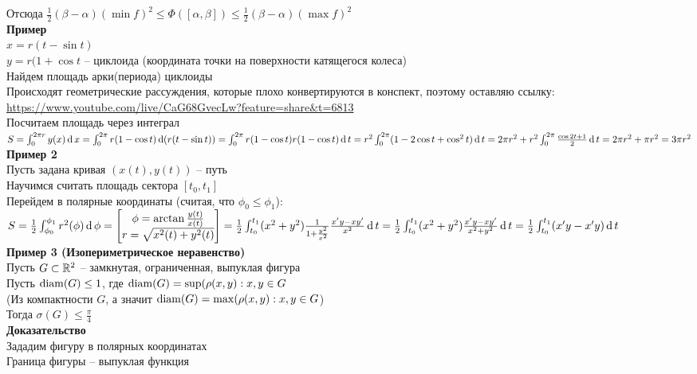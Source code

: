 \documentclass[12pt]{article}
\begin{document}
Отсюда $\frac12(\beta-\alpha) (\min f)^2 \leq \Phi([\alpha, \beta]) \leq \frac12(\beta - \alpha)(\max f)^2$\\
\textbf{Пример}\\
$x = r(t-\sin t)$\\
$y = r(1 + \cos t$ -- циклоида (координата точки на поверхности катящегося колеса)\\
Найдем площадь арки(периода) циклоиды\\
Происходят геометрические рассуждения, которые плохо конвертируются в конспект, поэтому оставляю ссылку: \url{https://www.youtube.com/live/CaG68GvecLw?feature=share&t=6813}\\
Посчитаем площадь через интеграл\\
$S = \int_0^{2\pi r}y(x)\operatorname{d} x = \int_0^{2\pi} r(1-\cos t)\operatorname{d} (r(t-\sin t)) = \int_0^{2\pi} r(1-\cos t)r(1-\cos t)\operatorname{d} t = r^2\int_0^{2\pi} (1 - 2\cos t + \cos^2t) \operatorname{d} t = 2\pi r^2 + r^2\int_0^{2\pi} \frac{\cos 2t + 1}2 \operatorname{d} t = 2\pi r^2 + \pi r^2 = 3\pi r^2$\\
\textbf{Пример 2}\\
Пусть задана кривая $(x(t), y(t))$ -- путь\\
Научимся считать площадь сектора $[t_0, t_1]$\\
Перейдем в полярные координаты (считая, что $\phi_0 \leq \phi_1$):\\
$S = \frac12 \int_{\phi_0}^{\phi_1} r^2(\phi)\operatorname{d} \phi = \begin{bmatrix}
    \phi = \arctan \frac{y(t)}{x(t)}\\
    r = \sqrt{x^2(t)+y^2(t)}
\end{bmatrix} = \frac12 \int_{t_0}^{t_1} (x^2+y^2)\frac1{1 + \frac{y^2}{x^2}} \frac{x'y-xy'}{x^2} \operatorname{d} t = \frac12 \int_{t_0}^{t_1} (x^2+y^2)\frac{x'y-xy'}{x^2+y^2}\operatorname{d} t = \frac12\int_{t_0}^{t_1}(x'y-x'y)\operatorname{d} t$\\
\textbf{Пример 3 (Изопериметрическое неравенство)}\\
Пусть $G \subset \mathbb{R}^2$ -- замкнутая, ограниченная, выпуклая фигура\\
Пусть $\operatorname{diam}(G) \leq 1$, где $\operatorname{diam}(G) = \sup (\rho(x,y): x,y \in G$\\
(Из компактности $G$, а значит $\operatorname{diam}(G) = \max (\rho(x,y): x,y \in G$)\\
Тогда $\sigma(G) \leq \frac\pi4$\\
\textbf{Доказательство}\\
Зададим фигуру в полярных координатах\\
Граница фигуры -- выпуклая функция\\
\end{document}
